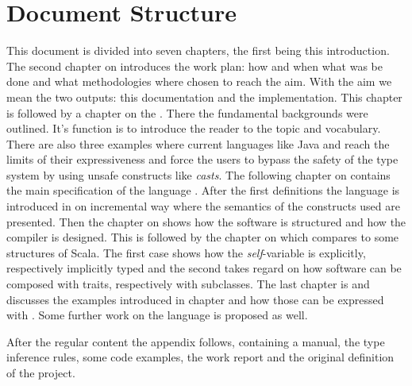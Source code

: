 \section{Document Structure}
This document is divided into seven chapters, the first being this introduction. The second chapter on
\emph{} introduces the work plan: how and
when what was be done and what methodologies where chosen to reach
the aim. With the aim we mean the two outputs: this documentation and
the implementation. This chapter is followed by a chapter on the
\emph{}. There the fundamental
backgrounds were outlined. It's function is to introduce the
reader to the topic and vocabulary. There are also three examples
where current languages like Java and \cs reach the limits of their expressiveness
and force the users to bypass the safety of the type system
by using unsafe constructs like \emph{casts}. The following
chapter on \emph{} contains
the main specification of the language \ooplss. After the first
definitions the language is introduced in on incremental way where
the semantics of the constructs used are presented. Then the chapter on
\emph{} shows how the software is
structured and how the compiler is designed. This is followed by the
chapter on \emph{}which compares \ooplss to some structures of Scala. The first case shows how the
\emph{self}-variable is explicitly, respectively implicitly typed and
the second takes regard on how software can be composed with traits,
respectively with subclasses. The last chapter is
\emph{} and discusses the examples
introduced in chapter \emph{} and how
those can be expressed with \ooplss. Some further work on the language
is proposed as well.

After the regular content the appendix follows, containing a manual, the type
inference rules, some code examples, the work report and the original
definition of the project.

